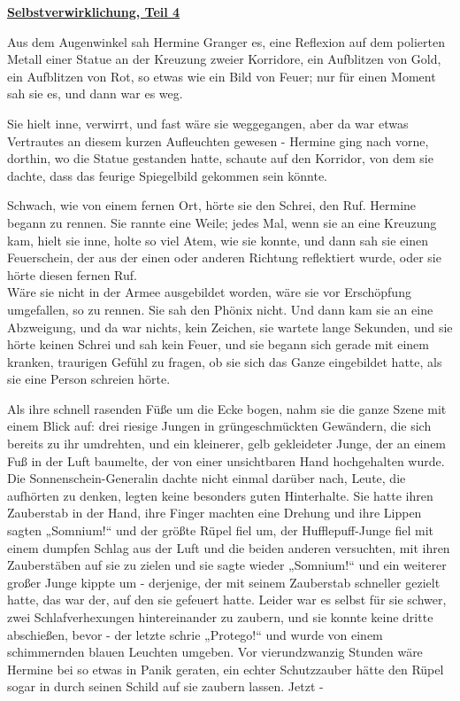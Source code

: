 

\hypertarget{selbstverwirklichung-teil-4}{%

\textbf{\uline{Selbstverwirklichung, Teil 4}}

\hfill\break Aus dem Augenwinkel sah Hermine Granger es, eine Reflexion auf dem polierten Metall einer Statue an der Kreuzung zweier Korridore, ein Aufblitzen von Gold, ein Aufblitzen von Rot, so etwas wie ein Bild von Feuer; nur für einen Moment sah sie es, und dann war es weg.

Sie hielt inne, verwirrt, und fast wäre sie weggegangen, aber da war etwas Vertrautes an diesem kurzen Aufleuchten gewesen - Hermine ging nach vorne, dorthin, wo die Statue gestanden hatte, schaute auf den Korridor, von dem sie dachte, dass das feurige Spiegelbild gekommen sein könnte.

Schwach, wie von einem fernen Ort, hörte sie den Schrei, den Ruf. Hermine begann zu rennen. Sie rannte eine Weile; jedes Mal, wenn sie an eine Kreuzung kam, hielt sie inne, holte so viel Atem, wie sie konnte, und dann sah sie einen Feuerschein, der aus der einen oder anderen Richtung reflektiert wurde, oder sie hörte diesen fernen Ruf.\\ Wäre sie nicht in der Armee ausgebildet worden, wäre sie vor Erschöpfung umgefallen, so zu rennen. Sie sah den Phönix nicht. Und dann kam sie an eine Abzweigung, und da war nichts, kein Zeichen, sie wartete lange Sekunden, und sie hörte keinen Schrei und sah kein Feuer, und sie begann sich gerade mit einem kranken, traurigen Gefühl zu fragen, ob sie sich das Ganze eingebildet hatte, als sie eine Person schreien hörte.

Als ihre schnell rasenden Füße um die Ecke bogen, nahm sie die ganze Szene mit einem Blick auf: drei riesige Jungen in grüngeschmückten Gewändern, die sich bereits zu ihr umdrehten, und ein kleinerer, gelb gekleideter Junge, der an einem Fuß in der Luft baumelte, der von einer unsichtbaren Hand hochgehalten wurde. Die Sonnenschein-Generalin dachte nicht einmal darüber nach, Leute, die aufhörten zu denken, legten keine besonders guten Hinterhalte. Sie hatte ihren Zauberstab in der Hand, ihre Finger machten eine Drehung und ihre Lippen sagten „Somnium!“ und der größte Rüpel fiel um, der Hufflepuff-Junge fiel mit einem dumpfen Schlag aus der Luft und die beiden anderen versuchten, mit ihren Zauberstäben auf sie zu zielen und sie sagte wieder „Somnium!“ und ein weiterer großer Junge kippte um - derjenige, der mit seinem Zauberstab schneller gezielt hatte, das war der, auf den sie gefeuert hatte. Leider war es selbst für sie schwer, zwei Schlafverhexungen hintereinander zu zaubern, und sie konnte keine dritte abschießen, bevor - der letzte schrie „Protego!“ und wurde von einem schimmernden blauen Leuchten umgeben. Vor vierundzwanzig Stunden wäre Hermine bei so etwas in Panik geraten, ein echter Schutzzauber hätte den Rüpel sogar in durch seinen Schild auf sie zaubern lassen. Jetzt -

}
